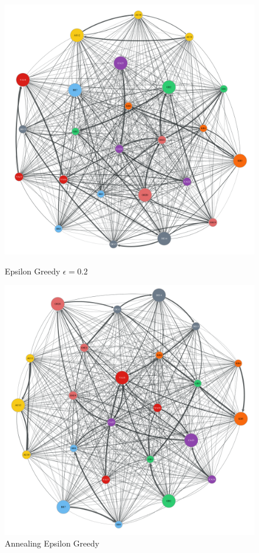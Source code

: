 \begin{figure}[t]
    \centering
      \includegraphics[width=\linewidth]{figures/b-epsilon-greedy-0-2-e3}
      \caption{Epsilon Greedy $\epsilon=0.2$}\label{fig:epsilon_greedy_e2}
  \endminipage\hfill
    \includegraphics[width=\linewidth]{figures/b-annealing-epsilon-greedy-e5}
    \caption{Annealing Epsilon Greedy}\label{fig:annealing_epsilon}
  \endminipage
\end{figure}

